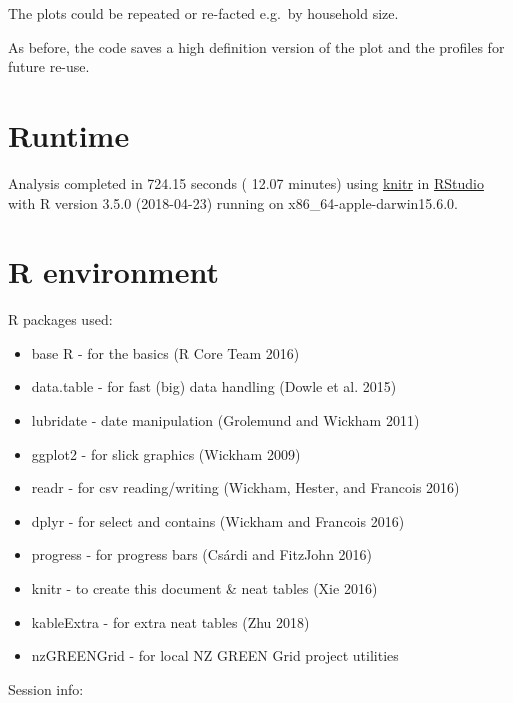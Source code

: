 \documentclass[]{article}
\providecommand{\tightlist}{%
  \setlength{\itemsep}{0pt}\setlength{\parskip}{0pt}}
\begin{document}
The plots could be repeated or re-facted e.g.~by household size.

As before, the code saves a high definition version of the plot and the
profiles for future re-use.

\section{Runtime}\label{runtime}

Analysis completed in 724.15 seconds ( 12.07 minutes) using
\href{https://cran.r-project.org/package=knitr}{knitr} in
\href{http://www.rstudio.com}{RStudio} with R version 3.5.0 (2018-04-23)
running on x86\_64-apple-darwin15.6.0.

\section{R environment}\label{r-environment}

R packages used:

\begin{itemize}
\tightlist
\item
  base R - for the basics (R Core Team 2016)
\item
  data.table - for fast (big) data handling (Dowle et al. 2015)
\item
  lubridate - date manipulation (Grolemund and Wickham 2011)
\item
  ggplot2 - for slick graphics (Wickham 2009)
\item
  readr - for csv reading/writing (Wickham, Hester, and Francois 2016)
\item
  dplyr - for select and contains (Wickham and Francois 2016)
\item
  progress - for progress bars (Csárdi and FitzJohn 2016)
\item
  knitr - to create this document \& neat tables (Xie 2016)
\item
  kableExtra - for extra neat tables (Zhu 2018)
\item
  nzGREENGrid - for local NZ GREEN Grid project utilities
\end{itemize}

Session info:
\end{document}
